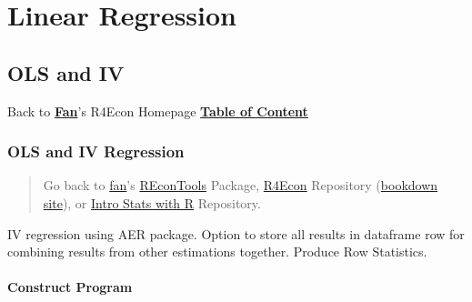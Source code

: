 \documentclass[
]{book}
\begin{document}
\hypertarget{linear-regression}{%
\chapter{Linear Regression}\label{linear-regression}}

\hypertarget{ols-and-iv}{%
\section{OLS and IV}\label{ols-and-iv}}

Back to \textbf{\href{https://fanwangecon.github.io/}{Fan}}'s R4Econ Homepage \textbf{\href{https://fanwangecon.github.io/R4Econ/}{Table of Content}}

\hypertarget{ols-and-iv-regression}{%
\subsection{OLS and IV Regression}\label{ols-and-iv-regression}}

\begin{quote}
Go back to \href{http://fanwangecon.github.io/}{fan}'s \href{https://fanwangecon.github.io/REconTools/}{REconTools} Package, \href{https://fanwangecon.github.io/R4Econ/}{R4Econ} Repository (\href{https://fanwangecon.github.io/R4Econ/bookdown}{bookdown site}), or \href{https://fanwangecon.github.io/Stat4Econ/}{Intro Stats with R} Repository.
\end{quote}

IV regression using AER package. Option to store all results in dataframe row for combining results from other estimations together. Produce Row Statistics.

\hypertarget{construct-program}{%
\subsubsection{Construct Program}\label{construct-program}}
\end{document}
